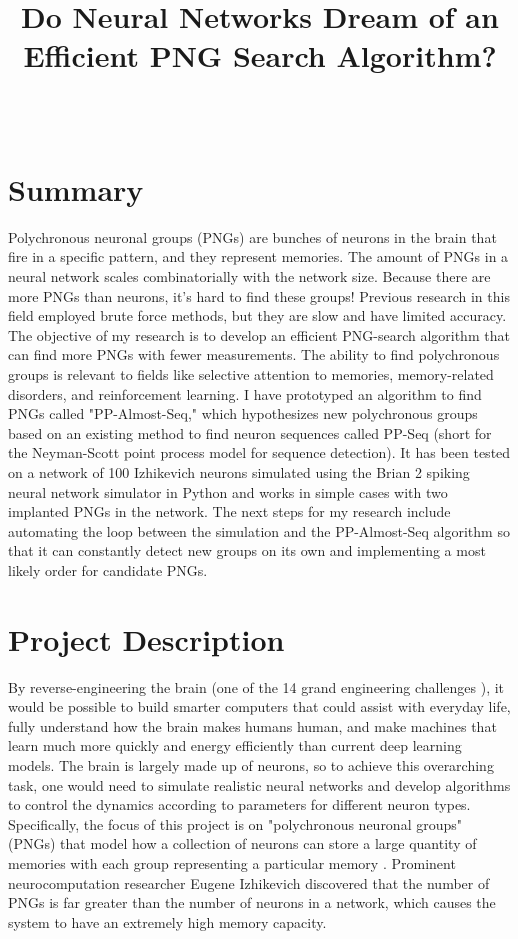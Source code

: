 \documentclass{sigchi}
\def\plaintitle{Do Neural Networks Dream of an Efficient PNG Search Algorithm?}
\begin{document}
\title{\plaintitle}

\author{%
  \\
  }

\maketitle


\section{Summary}
Polychronous neuronal groups (PNGs) are bunches of neurons in the brain that fire in a specific pattern, and they represent memories. The amount of PNGs in a neural network scales combinatorially with the network size. Because there are more PNGs than neurons, it's hard to find these groups! Previous research in this field employed brute force methods, but they are slow and have limited accuracy. The objective of my research is to develop an efficient PNG-search algorithm that can find more PNGs with fewer measurements. The ability to find polychronous groups is relevant to fields like selective attention to memories, memory-related disorders, and reinforcement learning. I have prototyped an algorithm to find PNGs called "PP-Almost-Seq," which hypothesizes new polychronous groups based on an existing method to find neuron sequences called PP-Seq (short for the Neyman-Scott point process model for sequence detection). It has been tested on a network of 100 Izhikevich neurons simulated using the Brian 2 spiking neural network simulator in Python and works in simple cases with two implanted PNGs in the network. The next steps for my research include automating the loop between the simulation and the PP-Almost-Seq algorithm so that it can constantly detect new groups on its own and implementing a most likely order for candidate PNGs.
\section{Project Description}
By reverse-engineering the brain (one of the 14 grand engineering challenges \cite{grandchal}), it would be possible to build smarter computers that could assist with everyday life, fully understand how the brain makes humans human, and make machines that learn much more quickly and energy efficiently than current deep learning models. The brain is largely made up of neurons, so to achieve this overarching task, one would need to simulate realistic neural networks and develop algorithms to control the dynamics according to parameters for different neuron types. Specifically, the focus of this project is on "polychronous neuronal groups" (PNGs) that model how a collection of neurons can store a large quantity of memories with each group representing a particular memory \cite{pngintro}. Prominent neurocomputation researcher Eugene Izhikevich discovered that the number of PNGs is far greater than the number of neurons in a network, which causes the system to have an extremely high memory capacity. 
\end{document}
